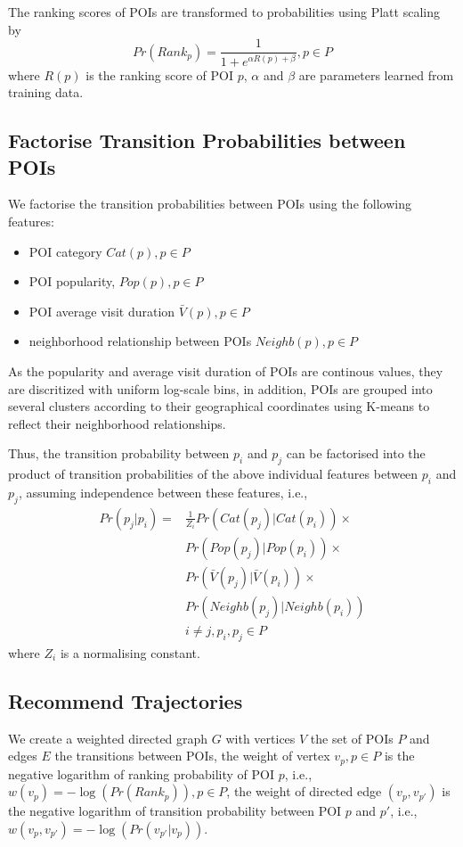 \documentclass{sig-alternate-05-2015}
\begin{document}
The ranking scores of POIs are transformed to probabilities using Platt scaling\cite{platt99} by
\begin{displaymath}
    Pr(Rank_p) = \frac{1}{1 + e^{\alpha R(p) + \beta}}, p \in P
\end{displaymath}
where $R(p)$ is the ranking score of POI $p$, $\alpha$ and $\beta$ are parameters learned from training data\cite{plattnote07}.


\subsection{Factorise Transition Probabilities between POIs}
We factorise the transition probabilities between POIs using the following features:
\begin{itemize}
\item POI category $Cat(p), p \in P$
\item POI popularity, $Pop(p), p \in P$
\item POI average visit duration $\bar{V}(p), p \in P$
\item neighborhood relationship between POIs $Neighb(p), p \in P$
\end{itemize}
As the popularity and average visit duration of POIs are continous values, 
they are discritized with uniform log-scale bins,
in addition,
POIs are grouped into several clusters according to their geographical coordinates using K-means
to reflect their neighborhood relationships.

Thus, the transition probability between $p_i$ and $p_j$ can be factorised into the product of
transition probabilities of the above individual features between $p_i$ and $p_j$, 
assuming independence between these features,
i.e.,
\begin{align*}
    Pr(p_j | p_i) = & \frac{1}{Z_i} Pr(Cat(p_j) | Cat(p_i)) \times \\ 
                    & Pr(Pop(p_j) | Pop(p_i)) \times \\
                    & Pr(\bar{V}(p_j) | \bar{V}(p_i)) \times \\
                    & Pr(Neighb(p_j) | Neighb(p_i)) \\
                    & i \ne j, p_i, p_j \in P
\end{align*}
where $Z_i$ is a normalising constant.

\subsection{Recommend Trajectories}
We create a weighted directed graph $G$ with vertices $V$ the set of POIs $P$ and 
edges $E$ the transitions between POIs,
the weight of vertex $v_{p}, p \in P$ is the negative logarithm of ranking probability of POI $p$, 
i.e.,
$w(v_{p}) = -\log(Pr(Rank_p)), p \in P$,
the weight of directed edge $(v_p, v_{p'})$ is the negative logarithm of transition probability between POI $p$ and $p'$,
i.e.,
$w(v_p, v_{p'}) = -\log(Pr(v_{p'} |v_p))$.
\end{document}
